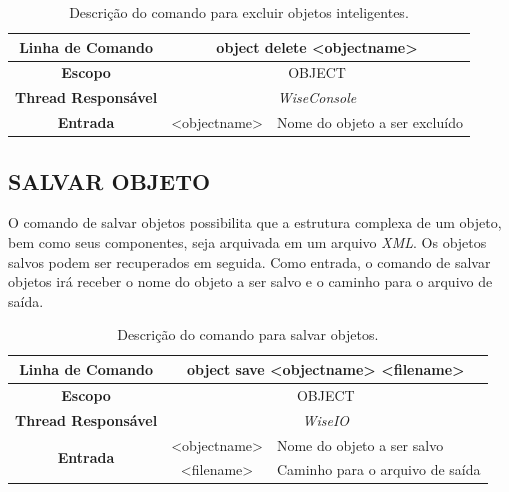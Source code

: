 \begin{center}
	\begin{table}[!htbp]
		\begin{tabularx}{\textwidth}{c|c|X}
			\toprule
			\textbf{Linha de Comando} & \multicolumn{2}{c}{object delete <object\underline{\space\space}name>} \\
			\midrule
			\textbf{Escopo} & \multicolumn{2}{c}{OBJECT} \\
			\hline
			\textbf{Thread Responsável} & \multicolumn{2}{c}{\textit{WiseConsole}} \\
			\hline
			\textbf{Entrada} & <object\underline{\space\space}name> & Nome do objeto a ser excluído \\
			\bottomrule
		\end{tabularx}
		\caption{Descrição do comando para excluir objetos inteligentes.}
		\label{tab:delete_object}
	\end{table}
\end{center}

\subsection{SALVAR OBJETO}\label{sec:save_object}

O comando de salvar objetos possibilita que a estrutura complexa de um objeto, bem como seus componentes, seja arquivada em um arquivo \textit{XML}. Os objetos salvos podem ser recuperados em seguida. Como entrada, o comando de salvar objetos irá receber o nome do objeto a ser salvo e o caminho para o arquivo de saída.

\begin{center}
	\begin{table}[!htbp]
		\begin{tabularx}{\textwidth}{c|c|X}
			\toprule
			\textbf{Linha de Comando} & \multicolumn{2}{c}{object save <object\underline{\space\space}name> <filename>} \\
			\midrule
			\textbf{Escopo} & \multicolumn{2}{c}{OBJECT} \\
			\hline
			\textbf{Thread Responsável} & \multicolumn{2}{c}{\textit{WiseIO}} \\
			\hline
			\multirow{2}{*}{\textbf{Entrada}} & <object\underline{\space\space}name> & Nome do objeto a ser salvo \\
			& <filename> & Caminho para o arquivo de saída \\
			\bottomrule
		\end{tabularx}
		\caption{Descrição do comando para salvar objetos.}
		\label{tab:save_object}
	\end{table}
\end{center}


